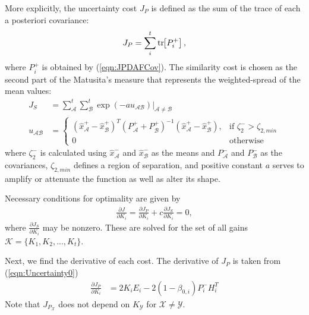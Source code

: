 \documentclass[10pt]{article}
\newcommand{\norm}[1]{\ensuremath{\left\| #1 \right\|}}
\newcommand{\bracket}[1]{\ensuremath{\left[ #1 \right]}}
\newcommand{\refeqn}[1]{(\ref{eqn:#1})}
\newcommand{\tr}[1]{\mathrm{tr}\ensuremath{\negthickspace\bracket{#1}}}
\newcommand{\deriv}[2]{\ensuremath{\frac{\partial #1}{\partial #2}}}
\theoremstyle{plain}\theorembodyfont{\normalfont}
\begin{document}
More explicitly, the uncertainty cost $J_P$ is defined as the sum of the trace of each a posteriori covariance:
\begin{align}
J_P=\sum\limits_{i}^{t}\tr{P^+_i},\label{eqn:JP}
\end{align}
where $P^+_{i}$ is obtained by \refeqn{JPDAFCov}. The similarity cost is chosen as the second part of the Matusita's measure that represents the weighted-spread of the mean values:
\begin{align}
J_S&=\sum\limits_{\mathcal{A}}^{t}\sum\limits_{\mathcal{B}}^{t}\exp (-au_{\mathcal{A}\mathcal{B}})\bigg|_{\mathcal{A}\neq\mathcal{B}}\\
u_{\mathcal{A}\mathcal{B}} & = \begin{cases} (\hat x_{\mathcal{A}}^+-\hat x^+_{\mathcal{B}})^T(P^+_{\mathcal{A}}+P^+_{\mathcal{B}})^{-1}(\hat x^+_{\mathcal{A}}-\hat x^+_{\mathcal{B}})\label{eqn:u}, & \mbox{if } \zeta_2^->\zeta_{2,min} \\ 0 & \mbox{otherwise}  \end{cases}
\end{align}
where $\zeta_2^-$ is calculated using $\hat x^-_{\mathcal A}$ and $\hat x^-_{\mathcal B}$ as the means and $P^-_\mathcal{A}$ and $P^-_\mathcal{B}$ as the covariances, $\zeta_{2,min}$ defines a region of separation, and positive constant $a$ serves to amplify or attenuate the function as well as alter its shape.

Necessary conditions for optimality are given by
\begin{align}
\deriv{J}{K_i} = \deriv{J_P}{K_i} + c \deriv{J_S}{K_i} =0,\label{eqn:NCO}
\end{align}
where $\deriv{J_S}{K_i}$ may be nonzero. These are solved for the set of all gains $\mathcal{K}=\{K_1,K_2,...,K_t\}$. 


Next, we find the derivative of each cost. The derivative of $J_P$ is taken from \refeqn{Uncertainty0}
\begin{align}
\label{eqn:CostP}
\frac{\partial J_{P}}{\partial K_{i}}&=2K_iE_i-2(1-\beta_{0,i})P^-_iH_i^T
\end{align}
Note that $J_{P_\mathcal{X}}$ does not depend on $K_\mathcal{Y}$ for $\mathcal{X}\neq \mathcal{Y}$.
\end{document}
